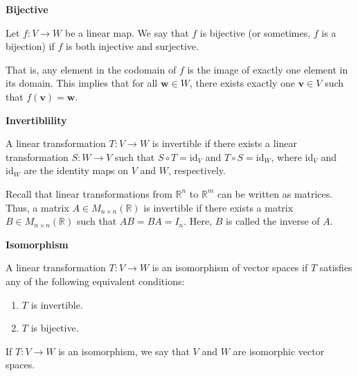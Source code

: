 \documentclass{article}
\begin{document}
\noindent \textbf{Bijective}

Let \( f: V \rightarrow W \) be a linear map. We say that \( f \) is bijective (or sometimes, \( f \) is a bijection) if \( f \) is both injective and surjective. 

That is, any element in the codomain of \( f \) is the image of exactly one element in its domain. This implies that for all \( \bm{w} \in W \), there exists exactly one \( \bm{v} \in V \) such that \( f(\bm{v}) = \bm{w} \).

\begin{center}
\end{center}

\vspace{0.5cm}

\noindent \textbf{Invertiblility}

A linear transformation \( T: V \rightarrow W \) is invertible if there exists a linear transformation \( S: W \rightarrow V \) such that \( S \circ T = \text{id}_V \) and \( T \circ S = \text{id}_W \), where \( \text{id}_V \) and \( \text{id}_W \) are the identity maps on \( V \) and \( W \), respectively.

Recall that linear transformations from \( \mathbb{R}^n \) to \( \mathbb{R}^m \) can be written as matrices. Thus, a matrix \( A \in M_{n \times n}(\mathbb{R}) \) is invertible if there exists a matrix \( B \in M_{n \times n}(\mathbb{R}) \) such that \( AB = BA = I_n \). Here, \( B \) is called the inverse of \( A \).

\vspace{0.5cm}

\noindent \textbf{Isomorphism}

A linear transformation \( T: V \rightarrow W \) is an isomorphism of vector spaces if \( T \) satisfies any of the following equivalent conditions:
\begin{enumerate}
    \item \( T \) is invertible.
    \item \( T \) is bijective.
\end{enumerate}
If \( T: V \rightarrow W \) is an isomorphism, we say that \( V \) and \( W \) are isomorphic vector spaces.
\end{document}
